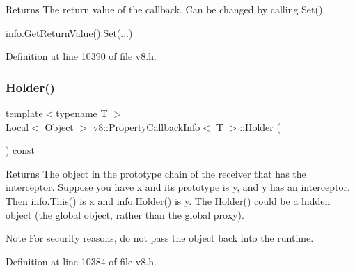 \begin{DoxyReturn}{Returns}
The return value of the callback. Can be changed by calling Set(). 
\begin{DoxyCode}
info.GetReturnValue().Set(...)
\end{DoxyCode}
 
\end{DoxyReturn}


Definition at line 10390 of file v8.\+h.

\mbox{\label{classv8_1_1PropertyCallbackInfo_a66b7ec267f18bd84e8baf0a0e16187b9}} 
\subsubsection{\texorpdfstring{Holder()}{Holder()}}
{\footnotesize\ttfamily template$<$typename T $>$ \\
\mbox{\hyperlink{classv8_1_1Local}{Local}}$<$ \mbox{\hyperlink{classv8_1_1Object}{Object}} $>$ \mbox{\hyperlink{classv8_1_1PropertyCallbackInfo}{v8\+::\+Property\+Callback\+Info}}$<$ \mbox{\hyperlink{classv8_1_1internal_1_1torque_1_1T}{T}} $>$\+::Holder (\begin{DoxyParamCaption}{ }\end{DoxyParamCaption}) const}

\begin{DoxyReturn}{Returns}
The object in the prototype chain of the receiver that has the interceptor. Suppose you have {\ttfamily x} and its prototype is {\ttfamily y}, and {\ttfamily y} has an interceptor. Then {\ttfamily info.\+This()} is {\ttfamily x} and {\ttfamily info.\+Holder()} is {\ttfamily y}. The \mbox{\hyperlink{classv8_1_1PropertyCallbackInfo_a66b7ec267f18bd84e8baf0a0e16187b9}{Holder()}} could be a hidden object (the global object, rather than the global proxy).
\end{DoxyReturn}
\begin{DoxyNote}{Note}
For security reasons, do not pass the object back into the runtime. 
\end{DoxyNote}


Definition at line 10384 of file v8.\+h.

\mbox{\label{classv8_1_1PropertyCallbackInfo_a82d79a9cdaac9807a0fa17331b159ce9}} 
